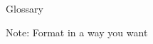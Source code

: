 \clearpage
{}
\begin{centering}
Glossary\\
\end{centering}

\noindent  Note: Format in a way you want \\

\lipsum[1]

